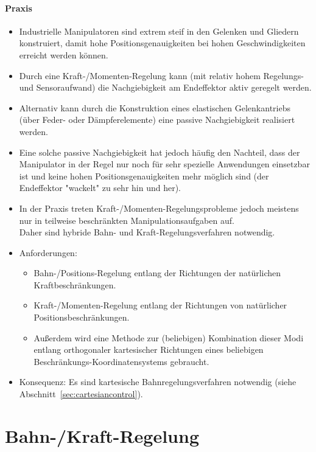 	\paragraph{Praxis}
		\begin{itemize}
			\item Industrielle Manipulatoren sind extrem steif in den Gelenken und Gliedern konstruiert, damit hohe Positionsgenauigkeiten bei hohen Geschwindigkeiten erreicht werden können.
			\item Durch eine Kraft-/Momenten-Regelung kann (mit relativ hohem Regelungs- und Sensoraufwand) die Nachgiebigkeit am Endeffektor aktiv geregelt werden.
			\item Alternativ kann durch die Konstruktion eines elastischen Gelenkantriebs (\zB über Feder- oder Dämpferelemente) eine passive Nachgiebigkeit realisiert werden.
			\item Eine solche passive Nachgiebigkeit hat jedoch häufig den Nachteil, dass der Manipulator in der Regel nur noch für sehr spezielle Anwendungen einsetzbar ist und keine hohen Positionsgenauigkeiten mehr möglich sind (der Endeffektor "wackelt" zu sehr hin und her).
			\item In der Praxis treten Kraft-/Momenten-Regelungsprobleme jedoch meistens nur in teilweise beschränkten Manipulationsaufgaben auf. \\ Daher sind hybride Bahn- und Kraft-Regelungsverfahren notwendig.
			\item Anforderungen:
				\begin{itemize}
					\item Bahn-/Positions-Regelung entlang der Richtungen der natürlichen Kraftbeschränkungen.
					\item Kraft-/Momenten-Regelung entlang der Richtungen von natürlicher Positionsbeschränkungen.
					\item Außerdem wird eine Methode zur (beliebigen) Kombination dieser Modi entlang orthogonaler kartesischer Richtungen eines beliebigen Beschränkungs-Koordinatensystems gebraucht.
				\end{itemize}
			\item Konsequenz: Es sind kartesische Bahnregelungsverfahren notwendig (siehe Abschnitt~\ref{sec:cartesiancontrol}).
		\end{itemize}

\section{Bahn-/Kraft-Regelung}
